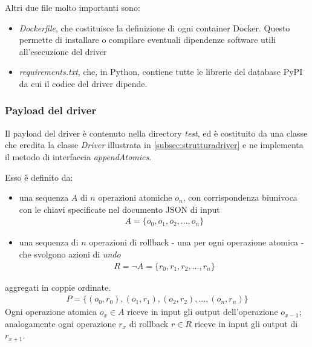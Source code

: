 \documentclass[../main.tex]{subfiles}
\begin{document}
Altri due file molto importanti sono:
\begin{itemize}
    \item \textit{Dockerfile}, che costituisce la definizione di ogni container Docker. Questo permette di installare o compilare eventuali dipendenze software utili all'esecuzione del driver 
    \item \textit{requirements.txt}, che, in Python, contiene tutte le librerie del database PyPI da cui il codice del driver dipende.
\end{itemize}


\subsubsection{Payload del driver}

\label{subsec:payload}
Il payload del driver è contenuto nella directory \textit{test}, ed è costituito da una classe che eredita la classe \textit{Driver} illustrata in \ref{subsec:strutturadriver} e ne implementa il metodo di interfaccia \textit{appendAtomics}.

Esso è definito da:
\begin{itemize}
\item una sequenza $A$ di $n$ operazioni atomiche $o_n$, con corrispondenza biunivoca con le chiavi specificate nel documento JSON di input
\begin{align*}
A = \{ o_0, o_1, o_2, ... , o_n \}
\end{align*}
\item una sequenza di $n$ operazioni di rollback - una per ogni operazione atomica - che svolgono azioni di \textit{undo}
\begin{align*}
R = \lnot A = \{ r_0, r_1, r_2, ... , r_n \}
\end{align*}
\end{itemize}
aggregati in coppie ordinate.
\begin{align*}
P = \{ (o_0, r_0), (o_1, r_1) , (o_2, r_2) , ... , (o_n, r_n)\}
\end{align*}
Ogni operazione atomica $o_x \in A$ riceve in input gli output dell'operazione $o_{x-1}$; analogamente ogni operazione $r_x$ di rollback $r \in R$ riceve in input gli output di $r_{x+1}$.
\end{document}
